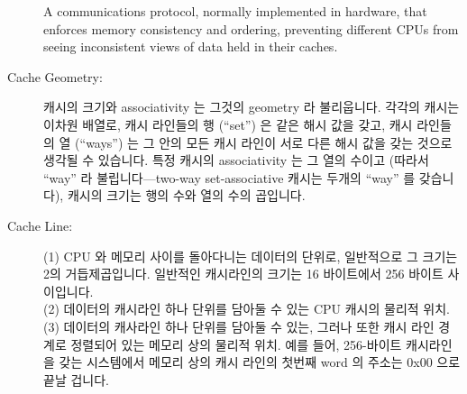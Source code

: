 \begin{description}
	A communications protocol, normally implemented in hardware,
	that enforces memory consistency and ordering, preventing
	different CPUs from seeing inconsistent views of data held
	in their caches.
	\fi
\item[Cache Geometry:]
	캐시의 크기와 associativity 는 그것의 geometry 라 불리웁니다.
	각각의 캐시는 이차원 배열로, 캐시 라인들의 행 (``set'') 은 같은 해시
	값을 갖고, 캐시 라인들의 열 (``ways'') 는 그 안의 모든 캐시 라인이 서로
	다른 해시 값을 갖는 것으로 생각될 수 있습니다.
	특정 캐시의 associativity 는 그 열의 수이고 (따라서 ``way'' 라
	불립니다---two-way set-associative 캐시는 두개의 ``way'' 를 갖습니다),
	캐시의 크기는 행의 수와 열의 수의 곱입니다.
	\iffalse

	The size and associativity of a cache is termed its geometry.
	Each cache may be thought of as a two-dimensional array,
	with rows of cache lines (``sets'') that have the same hash
	value, and columns of cache lines (``ways'') in which every
	cache line has a different hash value.
	The associativity of a given cache is its number of
	columns (hence the name ``way''---a two-way set-associative
	cache has two ``ways''), and the size of the cache is its
	number of rows multiplied by its number of columns.
	\fi
\item[Cache Line:]
	(1) CPU 와 메모리 사이를 돌아다니는 데이터의 단위로, 일반적으로 그
	크기는 2의 거듭제곱입니다.
	일반적인 캐시라인의 크기는 16 바이트에서 256 바이트 사이입니다. \\
	(2) 데이터의 캐시라인 하나 단위를 담아둘 수 있는 CPU 캐시의 물리적
	위치. \\
	(3) 데이터의 캐사라인 하나 단위를 담아둘 수 있는, 그러나 또한 캐시 라인
	경계로 정렬되어 있는 메모리 상의 물리적 위치.
	예를 들어, 256-바이트 캐시라인을 갖는 시스템에서 메모리 상의 캐시
	라인의 첫번째 word 의 주소는 0x00 으로 끝날 겁니다.
	\iffalse


\end{description}
